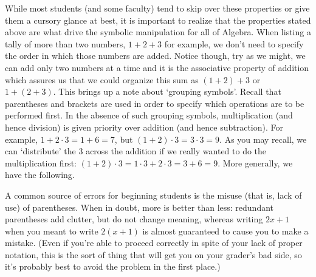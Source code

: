 While most students (and some faculty) tend to skip over these properties or give them a cursory glance at best, it is important to realize that the properties stated above are what drive the symbolic manipulation for all of Algebra.  When listing a tally of more than two numbers, $1 + 2 + 3$\label{howtoaddonetwothree} for example, we don't need to specify the order in which those numbers are added. Notice though, try as we might, we can add only two numbers at a time and it is the associative property of addition which assures us that we could organize this sum as $(1+2) + 3$ or $1+(2+3)$.  This brings up a note about `grouping symbols'.  Recall that parentheses and brackets are used in order to specify which operations are to be performed first.  In the absence of such grouping symbols, multiplication (and hence division) is given priority over addition (and hence subtraction). For example, $1 + 2 \cdot 3 = 1+6 = 7$, but $(1+2) \cdot 3 = 3 \cdot 3 = 9$.  As you may recall, we can `distribute' the $3$ across the addition if we really wanted to do the multiplication first:  $(1+2) \cdot 3 = 1\cdot 3 + 2 \cdot 3 = 3 + 6 = 9$. More generally, we have the following.

\medskip


\medskip

 A common source of errors for beginning students is the misuse (that is, lack of use) of parentheses. When in doubt, more is better than less: redundant parentheses add clutter, but do not change meaning, whereas writing $2x+1$ when you meant to write $2(x+1)$ is almost guaranteed to cause you to make a mistake. (Even if you're able to proceed correctly in spite of your lack of proper notation, this is the sort of thing that will get you on your grader's bad side, so it's probably best to avoid the problem in the first place.)

\medskip

